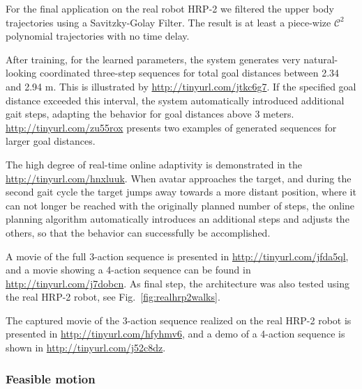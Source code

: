 For the final application on the real robot HRP-2 we filtered the upper body trajectories 
using a Savitzky-Golay Filter.
The result is at least a piece-wize $\mathcal{C}^2$ polynomial trajectories with no time delay.

After training, for the learned parameters, the system generates very natural-looking coordinated three-step
sequences for total goal distances between 2.34 and 2.94 m. This is illustrated by \url{http://tinyurl.com/jtkc6g7}. If the specified goal distance exceeded
this interval, the system automatically introduced additional gait steps, adapting the behavior for goal
distances above 3 meters. \url{http://tinyurl.com/zu55rox}
presents two examples of generated sequences for larger goal distances.

The high degree of real-time online adaptivity is demonstrated in the \url{http://tinyurl.com/hnxluuk}.
When avatar approaches the target, and during the second gait cycle the target jumps away towards a more distant position,
where it can not longer be reached with the originally planned number of steps, the online planning
algorithm automatically introduces an additional steps and adjusts the others, so
that the behavior can successfully be accomplished.

A movie of the full 3-action sequence is presented in \url{http://tinyurl.com/jfda5ql},
 and a movie showing a 4-action sequence can be found in \url{http://tinyurl.com/j7dobcn}.
As final step, the architecture was also tested using the real HRP-2 robot, see Fig.~\ref{fig:realhrp2walks}.

The captured movie of the 3-action sequence realized on the real HRP-2 robot is presented in \url{http://tinyurl.com/hfyhmv6}, and a demo of a 4-action sequence is shown in \mbox{\url{http://tinyurl.com/j52c8dz}}.

%
\subsubsection{Feasible motion}

